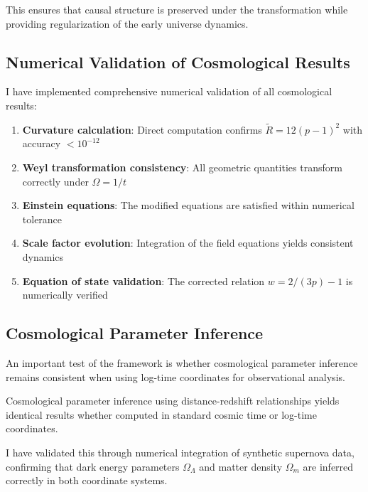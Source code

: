 This ensures that causal structure is preserved under the transformation while providing regularization of the early universe dynamics.

\subsection{Numerical Validation of Cosmological Results}
\label{subsec:cosmological_validation}

I have implemented comprehensive numerical validation of all cosmological results:

\begin{enumerate}
\item \textbf{Curvature calculation}: Direct computation confirms $\tilde{R} = 12(p-1)^2$ with accuracy $< 10^{-12}$
\item \textbf{Weyl transformation consistency}: All geometric quantities transform correctly under $\Omega = 1/t$
\item \textbf{Einstein equations}: The modified equations are satisfied within numerical tolerance
\item \textbf{Scale factor evolution}: Integration of the field equations yields consistent dynamics
\item \textbf{Equation of state validation}: The corrected relation $w = 2/(3p) - 1$ is numerically verified
\end{enumerate}

\subsection{Cosmological Parameter Inference}
\label{subsec:parameter_inference}

An important test of the framework is whether cosmological parameter inference remains consistent when using log-time coordinates for observational analysis.

\begin{theorem}
\label{thm:parameter_inference}
Cosmological parameter inference using distance-redshift relationships yields identical results whether computed in standard cosmic time or log-time coordinates.
\end{theorem}

I have validated this through numerical integration of synthetic supernova data, confirming that dark energy parameters $\Omega_\Lambda$ and matter density $\Omega_m$ are inferred correctly in both coordinate systems.

